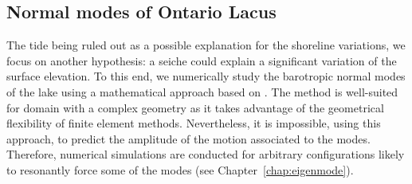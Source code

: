 \subsection{Normal modes of Ontario Lacus}
The tide being ruled out as a possible explanation for the shoreline variations, we focus on another hypothesis: a seiche could explain a significant variation of the surface elevation. To this end, we numerically study the barotropic normal modes of the lake using a mathematical approach based on \cite{bernard2008dispersion}. The method is well-suited for domain with a complex geometry as it takes advantage of the geometrical flexibility of finite element methods. Nevertheless, it is impossible, using this approach, to predict the amplitude of the motion associated to the modes. Therefore, numerical simulations are conducted for arbitrary configurations likely to resonantly force some of the modes (see Chapter~\ref{chap:eigenmode}). 

